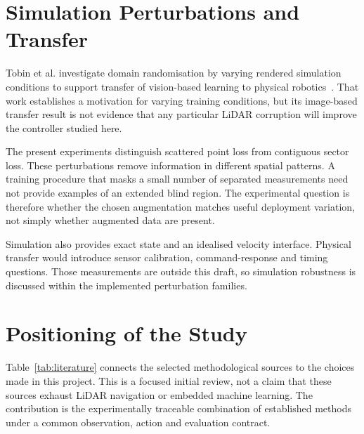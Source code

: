 \section{Simulation Perturbations and Transfer}
Tobin et al. investigate domain randomisation by varying rendered simulation
conditions to support transfer of vision-based learning to physical
robotics~\cite{tobin2017domain}. That work establishes a motivation for varying
training conditions, but its image-based transfer result is not evidence that
any particular LiDAR corruption will improve the controller studied here.

The present experiments distinguish scattered point loss from contiguous
sector loss. These perturbations remove information in different spatial
patterns. A training procedure that masks a small number of separated
measurements need not provide examples of an extended blind region. The
experimental question is therefore whether the chosen augmentation matches
useful deployment variation, not simply whether augmented data are present.

Simulation also provides exact state and an idealised velocity interface.
Physical transfer would introduce sensor calibration, command-response and
timing questions. Those measurements are outside this draft, so simulation
robustness is discussed within the implemented perturbation families.

\section{Positioning of the Study}
Table~\ref{tab:literature} connects the selected methodological sources to the
choices made in this project. This is a focused initial review, not a claim
that these sources exhaust LiDAR navigation or embedded machine learning.
The contribution is the experimentally traceable combination of established
methods under a common observation, action and evaluation contract.

